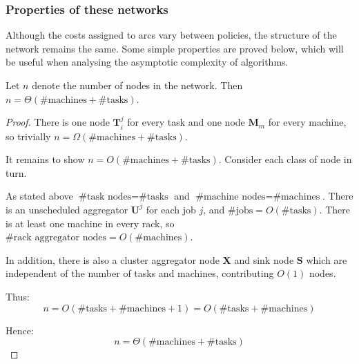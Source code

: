 \subsubsection{Properties of these networks}


Although the costs assigned to arcs vary between policies, the structure of the network remains the same. Some simple properties are proved below, which will be useful when analysing the asymptotic complexity of algorithms.

\begin{lemma} \label{lemma:network-num-nodes}
Let $n$ denote the number of nodes in the network. Then $n = \Theta\left(\text{\# machines} + \text{\# tasks}\right)$.
\end{lemma}
\begin{proof}
There is one node $\mathbf{T}_i^j$ for every task and one node $\mathbf{M}_m$ for every machine, so trivially $n = \Omega\left(\text{\# machines} + \text{\# tasks}\right)$.

It remains to show $n = O\left(\text{\# machines} + \text{\# tasks}\right)$. Consider each class of node in turn.

As stated above $\text{\# task nodes} = \text{\# tasks}$ and $\text{\# machine nodes} = \text{\# machines}$. There is an unscheduled aggregator $\mathbf{U}^j$ for each job $j$, and $\text{\# jobs} = O\left(\text{\# tasks}\right)$. There is at least one machine in every rack, so $\text{\# rack aggregator nodes} = O\left(\text{\# machines}\right)$. 

In addition, there is also a cluster aggregator node $\mathbf{X}$ and sink node $\mathbf{S}$ which are independent of the number of tasks and machines, contributing $O(1)$ nodes.

Thus:
\[n = O\left(\text{\# tasks} + \text{\# machines} + 1\right) = O\left(\text{\# tasks} + \text{\# machines}\right)\]

Hence:
\[n = \Theta\left(\text{\# machines} + \text{\# tasks}\right)\]
\end{proof}

